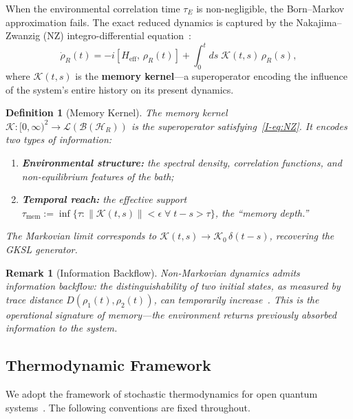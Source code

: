\documentclass[12pt,a4paper,openany]{book}
\newtheorem{definition}[theorem]{Definition}
\newtheorem{remark}[theorem]{Remark}
\begin{document}
When the environmental correlation time $\tau_E$ is non-negligible,
the Born--Markov approximation fails. The exact reduced dynamics
is captured by the Nakajima--Zwanzig (NZ) integro-differential
equation~\cite{Nakajima1958,Zwanzig1960}:
\begin{equation}
\label{I-eq:NZ}
\dot{\rho}_R(t)
= -i[H_{\mathrm{eff}},\, \rho_R(t)]
  + \int_0^t ds\; \mathcal{K}(t,s)\, \rho_R(s),
\end{equation}
where $\mathcal{K}(t,s)$ is the \textbf{memory kernel}---a
superoperator encoding the influence of the system's entire
history on its present dynamics.

\begin{definition}[Memory Kernel]
\label{I-def:kernel}
The memory kernel $\mathcal{K}: [0,\infty)^2 \to
\mathcal{L}(\mathcal{B}(\mathcal{H}_R))$ is the superoperator
satisfying~\eqref{I-eq:NZ}. It encodes two types of information:
\begin{enumerate}
\item \textbf{Environmental structure:} the spectral density,
  correlation functions, and non-equilibrium features of the bath;
\item \textbf{Temporal reach:} the effective support
  $\tau_{\mathrm{mem}} := \inf\{\tau : \|\mathcal{K}(t,s)\| < \epsilon
  \;\forall\; t - s > \tau\}$, the ``memory depth.''
\end{enumerate}
The Markovian limit corresponds to
$\mathcal{K}(t,s) \to \mathcal{K}_0\, \delta(t-s)$,
recovering the GKSL generator.
\end{definition}

\begin{remark}[Information Backflow]
\label{I-rem:backflow}
Non-Markovian dynamics admits \emph{information backflow}:
the distinguishability of two initial states, as measured by
trace distance $D(\rho_1(t), \rho_2(t))$, can temporarily
increase~\cite{BreuerLainePiilo2009}. This is the operational
signature of memory---the environment returns previously
absorbed information to the system.
\end{remark}

\subsection{Thermodynamic Framework}
\label{I-subsec:thermo}

We adopt the framework of stochastic thermodynamics for open
quantum systems~\cite{EspositoLindenbergVandenBroeck2010}.
The following conventions are fixed throughout.
\end{document}
